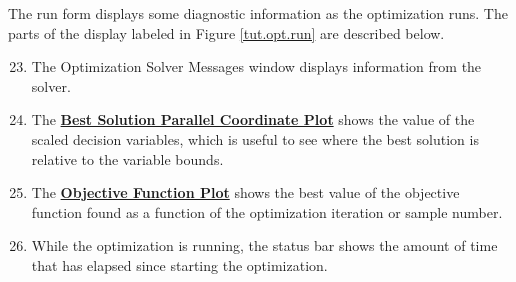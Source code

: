 The run form displays some diagnostic information as the optimization runs. The parts of the display labeled in Figure \ref{tut.opt.run} are described below.
\begin{enumerate}
	\setcounter{enumi}{22}
	\item The Optimization Solver Messages window displays information from the solver.
	\item The \textbf{\underline{Best Solution Parallel Coordinate Plot}} shows the value of the scaled decision variables, which is useful to see where the best solution is relative to the variable bounds.
	\item The \textbf{\underline{Objective Function Plot}} shows the best value of the objective function found as a function of the optimization iteration or sample number.
	\item While the optimization is running, the status bar shows the amount of time that has elapsed since starting the optimization.
\end{enumerate}
